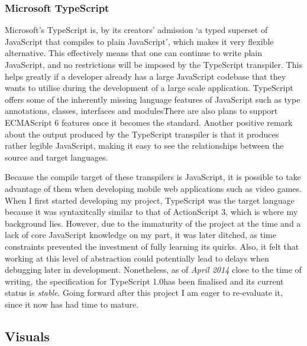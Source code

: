 \documentclass[final]{cmpreport}
\begin{document}
\subsubsection{Microsoft TypeScript}
Microsoft's TypeScript is, by its creators' admission `a typed superset of JavaScript that compiles to plain JavaScript', which makes it very flexible alternative. This effectively means that one can continue to write plain JavaScript, and no restrictions will be imposed by the TypeScript transpiler. This helps greatly if a developer already has a large JavaScript codebase that they wants to utilise during the development of a large scale application. TypeScript offers some of the inherently missing language features of JavaScript such as type annotations, classes, interfaces and modules\. There are also plans to support ECMAScript 6 features once it becomes the standard. Another positive remark about the output produced by the TypeScript transpiler is that it produces rather legible JavaScript, making it easy to see the relationships between the source and target languages.

Because the compile target of these transpilers is JavaScript, it is possible to take advantage of them when developing mobile web applications such as video games. When I first started developing my project, TypeScript was the target language because it was syntaxitcally similar to that of ActionScript 3, which is where my background lies. However, due to the immaturity of the project at the time and a lack of core JavaScript knowledge on my part, it was later ditched, as time constraints prevented the investment of fully learning its quirks. Also, it felt that working at this level of abstraction could potentially lead to delays when debugging later in development. Nonetheless, as of \textit{April 2014} close to the time of writing, the specification for TypeScript 1.0\footnotemark has been finalised and its current status is \textit{stable}. Going forward after this project I am eager to re-evaluate it, since it now has had time to mature.


\subsection{Visuals}
\end{document}
